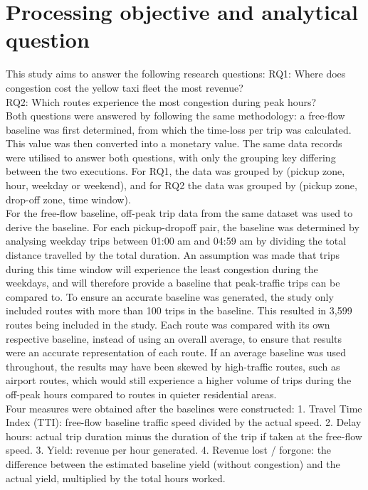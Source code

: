 \documentclass[conference]{IEEEtran}
\begin{document}
\section{Processing objective and analytical question}
This study aims to answer the following research questions:
RQ1: Where does congestion cost the yellow taxi fleet the most revenue?\\
RQ2: Which routes experience the most congestion during peak hours?\\

Both questions were answered by following the same methodology: a free-flow baseline was first determined, from which the time-loss per trip was calculated. This value was then converted into a monetary value. The same data records were utilised to answer both questions, with only the grouping key differing between the two executions. For RQ1, the data was grouped by (pickup zone, hour, weekday or weekend), and for RQ2 the data was grouped by (pickup zone, drop-off zone, time window). \\

For the free-flow baseline, off-peak trip data from the same dataset was used to derive the baseline. For each pickup-dropoff pair, the baseline was determined by analysing weekday trips between 01:00 am and 04:59 am by dividing the total distance travelled by the total duration. An assumption was made that trips during this time window will experience the least congestion during the weekdays, and will therefore provide a baseline that peak-traffic trips can be compared to. To ensure an accurate baseline was generated, the study only included routes with more than 100 trips in the baseline. This resulted in 3,599 routes being included in the study. Each route was compared with its own respective baseline, instead of using an overall average, to ensure that results were an accurate representation of each route. If an average baseline was used throughout, the results may have been skewed by high-traffic routes, such as airport routes, which would still experience a higher volume of trips during the off-peak hours compared to routes in quieter residential areas.\\ 

Four measures were obtained after the baselines were constructed:
1. Travel Time Index (TTI): free-flow baseline traffic speed divided by the actual speed.
2. Delay hours: actual trip duration minus the duration of the trip if taken at the free-flow speed.
3. Yield: revenue per hour generated. 
4. Revenue lost / forgone: the difference between the estimated baseline yield (without congestion) and the actual yield, multiplied by the total hours worked. \\
\end{document}
